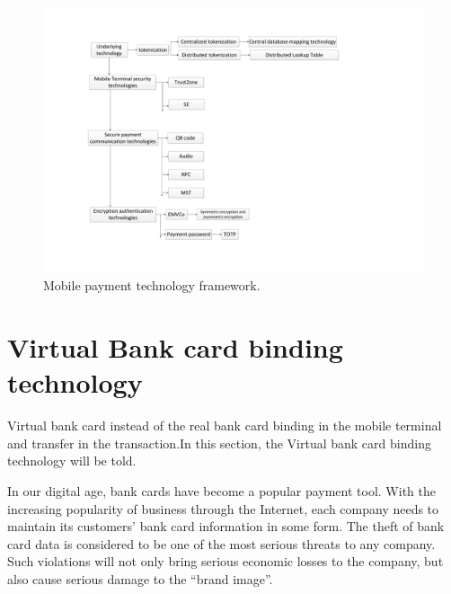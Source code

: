 \documentclass[journal]{IEEEtran}
\begin{document}
\begin{figure}[htbp]
\centerline{\includegraphics[scale=0.48]{tec.pdf}}
\caption{Mobile payment technology framework.}
\label{fig}
\end{figure}

\section{Virtual Bank card binding technology}
Virtual bank card instead of the real bank card binding in the mobile terminal and transfer in the transaction.In this section, the Virtual bank card binding technology will be told. 


In our digital age, bank cards have become a popular payment tool. With the increasing popularity of business through the Internet, each company needs to maintain its customers' bank card information in some form. The theft of bank card data is considered to be one of the most serious threats to any company. Such violations will not only bring serious economic losses to the company, but also cause serious damage to the “brand image”.
\end{document}

